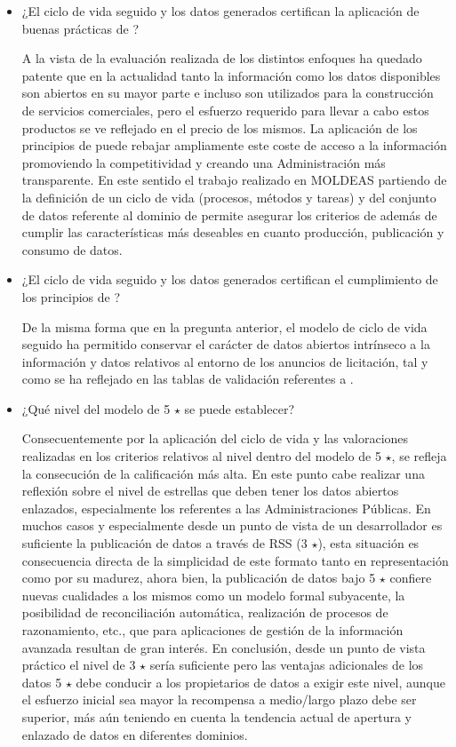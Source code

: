 \begin{itemize}
 \item ¿El ciclo de vida seguido y los datos generados certifican la aplicación de buenas prácticas de \linkeddata?

A la vista de la evaluación realizada de los distintos enfoques ha quedado patente que en la actualidad tanto la información 
como los datos disponibles son abiertos en su mayor parte e incluso son utilizados para la construcción de servicios 
comerciales, pero el esfuerzo requerido para llevar a cabo estos productos se ve reflejado en el precio de los mismos. La aplicación 
de los principios de \linkeddata puede rebajar ampliamente este coste de acceso a la información promoviendo la 
competitividad y creando una Administración más transparente. En este sentido el trabajo realizado en \gls{MOLDEAS} partiendo 
de la definición de un ciclo de vida (procesos, métodos y tareas) y del conjunto de datos referente al dominio de 
\eproc permite asegurar los criterios de \linkeddata además de cumplir las características más 
deseables en cuanto producción, publicación y consumo de datos.

 \item ¿El ciclo de vida seguido y los datos generados certifican el cumplimiento de los principios de \opendata?

De la misma forma que en la pregunta anterior, el modelo de ciclo de vida seguido ha permitido conservar el carácter 
de datos abiertos intrínseco a la información y datos relativos al entorno de los anuncios de licitación, tal y como se ha reflejado 
en las tablas de validación referentes a \opendata.

 \item ¿Qué nivel del modelo de 5 $\star$ se puede establecer?

Consecuentemente por la aplicación del ciclo de vida y las valoraciones realizadas en los criterios relativos al nivel 
dentro del modelo de 5 $\star$, se refleja la consecución de la calificación más alta. En este punto cabe realizar una reflexión 
sobre el nivel de estrellas que deben tener los datos abiertos enlazados, especialmente los referentes a las Administraciones Públicas. En muchos 
casos y especialmente desde un punto de vista de un desarrollador es suficiente la publicación de datos a través de \gls{RSS} (3 $\star$), esta situación 
es consecuencia directa de la simplicidad de este formato tanto en representación como por su madurez, ahora bien, la publicación de datos 
bajo 5 $\star$ confiere nuevas cualidades a los mismos como un modelo formal subyacente, la posibilidad de reconciliación automática, realización 
de procesos de razonamiento, etc., que para aplicaciones de gestión de la información avanzada resultan de gran interés. En conclusión, 
desde un punto de vista práctico el nivel de 3 $\star$ sería suficiente pero las ventajas adicionales de los datos 5 $\star$ debe conducir a los
 propietarios de datos a exigir este nivel, aunque el esfuerzo inicial sea mayor la recompensa a medio/largo 
plazo debe ser superior, más aún teniendo en cuenta la tendencia actual de apertura y enlazado de datos en diferentes dominios. 


\end{itemize}
